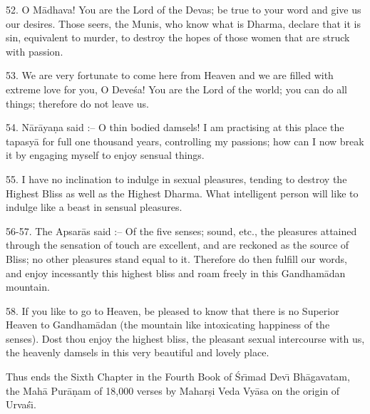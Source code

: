 52. O M\=adhava! You are the Lord of the Devas; be true to your word and give us our desires. Those seers, the Munis, who know what is Dharma, declare that it is sin, equivalent to murder, to destroy the hopes of those women that are struck with passion.

53. We are very fortunate to come here from Heaven and we are filled with extreme love for you, O Deve\'sa! You are the Lord of the world; you can do all things; therefore do not leave us.

54. N\=ar\=aya\d{n}a said :-- O thin bodied damsels! I am practising at this place the tapasy\=a for full one thousand years, controlling my passions; how can I now break it by engaging myself to enjoy sensual things.

55. I have no inclination to indulge in sexual pleasures, tending to destroy the Highest Bliss as well as the Highest Dharma. What intelligent person will like to indulge like a beast in sensual pleasures.

56-57. The Apsar\=as said :-- Of the five senses; sound, etc., the pleasures attained through the sensation of touch are excellent, and are reckoned as the source of Bliss; no other pleasures stand equal to it. Therefore do then fulfill our words, and enjoy incessantly this highest bliss and roam freely in this Gandham\=adan mountain.

58. If you like to go to Heaven, be pleased to know that there is no Superior Heaven to Gandham\=adan (the mountain like intoxicating happiness of the senses). Dost thou enjoy the highest bliss, the pleasant sexual intercourse with us, the heavenly damsels in this very beautiful and lovely place.

Thus ends the Sixth Chapter in the Fourth Book of \'Sr\={\i}mad Dev\={\i} Bh\=agavatam, the Mah\=a Pur\=a\d{n}am of 18,000 verses by Mahar\d{s}i Veda Vy\=asa on the origin of Urva\'s\={\i}.




